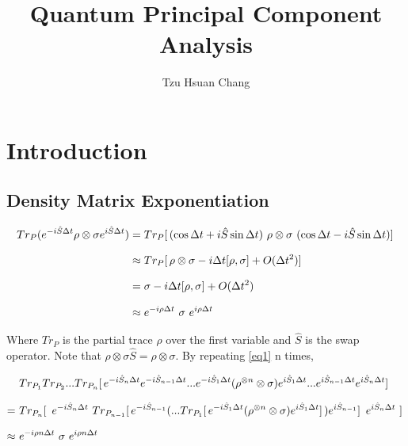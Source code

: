 \documentclass[a4paper]{article}
\title{Quantum Principal Component Analysis}
\author{Tzu Hsuan Chang}
\begin{document}
\maketitle

\section{Introduction}
\label{sec:Intro}


\subsection*{Density Matrix Exponentiation}
\label{subsec:dme}

    \begin{equation} \label{eq1}
    \setlength{\jot}{10pt}
    \begin{aligned}
        Tr_P ( e^{-i \hat{S} \Delta t} \rho  \otimes \sigma e^{i \hat{S} \Delta t} )
            &= Tr_P [ \, ( \cos \Delta t + i \hat{S} \sin \Delta t ) \ \rho \otimes \sigma \ ( \cos \Delta t - i \hat{S} \sin \Delta t ) ] \, \\
            &\approx Tr_P [ \, \rho \otimes \sigma - i \Delta t [\rho, \sigma] + O(\Delta t^2) ] \, \\
            &= \sigma - i \Delta t [\rho, \sigma] + O (\Delta t^2) \\
            &\approx e^{-i \rho \Delta t} \ \sigma \ e^{i \rho \Delta t}
    \end{aligned}
    \end{equation}


Where $Tr_P$ is the partial trace $\rho$ over the first variable and $\hat{S}$ is the swap operator. Note that $\rho \otimes \sigma \hat{S} = \rho \otimes \sigma$. By repeating \eqref{eq1} n times,

    \begin{equation} \label{eq2}
    \setlength{\jot}{10pt}
    \begin{aligned}
        &Tr_{P_1} Tr_{P_2} ... Tr_{P_n} [ \, e^{-i \hat{S}_n \Delta t} e^{-i \hat{S}_{n-1} \Delta t} ... e^{-i \hat{S}_1 \Delta t} ( \rho^{\otimes n}  \otimes \sigma ) e^{i \hat{S}_1 \Delta t} ... e^{i \hat{S}_{n-1} \Delta t} e^{i \hat{S}_n \Delta t} ] \, \\
        = \ &Tr_{P_n} [ \, \ 
            e^{-i \hat{S}_n \Delta t} \ 
            Tr_{P_{n-1}} [\, 
            e^{-i \hat{S}_{n-1}}
                (... Tr_{P_1} [ \, e^{-i \hat{S}_1 \Delta t} ( \rho^{\otimes n}  \otimes \sigma ) e^{i \hat{S}_1 \Delta t} ] \,)  
                    e^{i \hat{S}_{n-1}}
                ] \, \
                e^{i \hat{S}_n \Delta t} \ 
        ] \, \\
        \approx \ &e^{-i \rho n \Delta t} \ \sigma \ e^{i \rho n \Delta t}
    \end{aligned}
    \end{equation}
\end{document}
